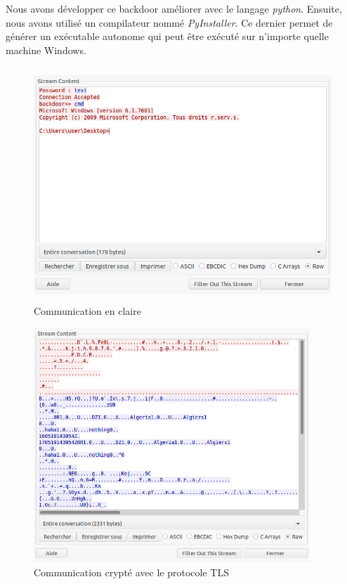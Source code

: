        Nous avons développer ce backdoor améliorer avec le langage \emph{python}. 
        Ensuite, nous avons utilisé un 
        compilateur nommé \emph{PyInstaller}. Ce dernier permet de générer un exécutable autonome qui peut être exécuté
        sur n'importe quelle machine Windows.

        \begin{figure}[H]
            \centering
            \includegraphics[width=0.8\linewidth, height=250pt]{images/communication_claire.png}
            \caption{Communication en claire}
            \label{communication_claire}
        \end{figure}

\newpage

        \begin{figure}[H]
            \centering
            \includegraphics[width=0.8\linewidth, height=250pt]{images/communication_cryptee.png}
            \caption{Communication crypté avec le protocole TLS}
            \label{communication_cryptee}
        \end{figure}


